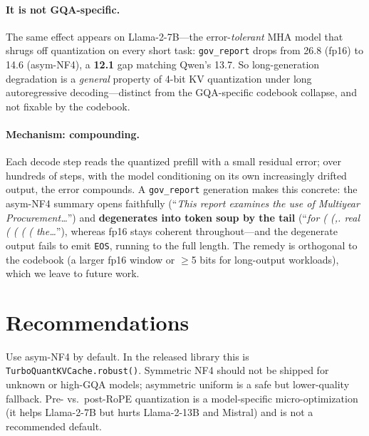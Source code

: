 \documentclass[11pt]{article}
\begin{document}
\paragraph{It is not GQA-specific.} The same effect appears on Llama-2-7B---the error-\emph{tolerant}
MHA model that shrugs off quantization on every short task: \texttt{gov\_report} drops from 26.8
(fp16) to 14.6 (asym-NF4), a \textbf{12.1} gap matching Qwen's 13.7. So long-generation
degradation is a \emph{general} property of 4-bit KV quantization under long autoregressive
decoding---distinct from the GQA-specific codebook collapse, and not fixable by the codebook.

\paragraph{Mechanism: compounding.} Each decode step reads the quantized prefill with a small
residual error; over hundreds of steps, with the model conditioning on its own increasingly
drifted output, the error compounds. A \texttt{gov\_report} generation makes this concrete: the
asym-NF4 summary opens faithfully (``\emph{This report examines the use of Multiyear
Procurement\dots}'') and \textbf{degenerates into token soup by the tail} (``\emph{for ( (,.
real ( ( ( ( the\dots}''), whereas fp16 stays coherent throughout---and the degenerate output
fails to emit \texttt{EOS}, running to the full length. The remedy is orthogonal to the codebook
(a larger fp16 window or $\ge$5 bits for long-output workloads), which we leave to future work.

\section{Recommendations}
Use asym-NF4 by default. In the released library this is \texttt{TurboQuantKVCache.robust()}.
Symmetric NF4 should not be shipped for unknown or high-GQA models; asymmetric uniform is a
safe but lower-quality fallback. Pre- vs.\ post-RoPE quantization is a model-specific
micro-optimization (it helps Llama-2-7B but hurts Llama-2-13B and Mistral) and is not a
recommended default.
\end{document}
